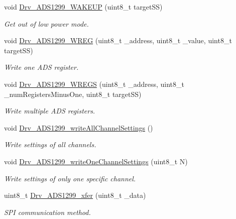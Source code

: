\begin{DoxyCompactItemize}
void \hyperlink{group__ADS1299__Library_ga641da43b050b7dfd11d3f8234d129158}{Drv\+\_\+\+A\+D\+S1299\+\_\+\+W\+A\+K\+E\+UP} (uint8\+\_\+t target\+SS)
\begin{DoxyCompactList}\small\item\em Get out of low power mode. \end{DoxyCompactList}\item 
void \hyperlink{group__ADS1299__Library_gaeb3dbf8ae39e90411b32757240f61b8b}{Drv\+\_\+\+A\+D\+S1299\+\_\+\+W\+R\+EG} (uint8\+\_\+t \+\_\+address, uint8\+\_\+t \+\_\+value, uint8\+\_\+t target\+SS)
\begin{DoxyCompactList}\small\item\em Write one A\+DS register. \end{DoxyCompactList}\item 
void \hyperlink{group__ADS1299__Library_gac0ee4d97d673cfedde936fb9d81e8c5d}{Drv\+\_\+\+A\+D\+S1299\+\_\+\+W\+R\+E\+GS} (uint8\+\_\+t \+\_\+address, uint8\+\_\+t \+\_\+num\+Registers\+Minus\+One, uint8\+\_\+t target\+SS)
\begin{DoxyCompactList}\small\item\em Write multiple A\+DS registers. \end{DoxyCompactList}\item 
void \hyperlink{group__ADS1299__Library_ga6191cb19901b35ad7f9e5d999064dac3}{Drv\+\_\+\+A\+D\+S1299\+\_\+write\+All\+Channel\+Settings} ()
\begin{DoxyCompactList}\small\item\em Write settings of all channels. \end{DoxyCompactList}\item 
void \hyperlink{group__ADS1299__Library_gab10b419566b34fa502514a113505312d}{Drv\+\_\+\+A\+D\+S1299\+\_\+write\+One\+Channel\+Settings} (uint8\+\_\+t N)
\begin{DoxyCompactList}\small\item\em Write settings of only one specific channel. \end{DoxyCompactList}\item 
uint8\+\_\+t \hyperlink{group__ADS1299__Library_gaacd804d5af6ab72174a9cb050dcf9041}{Drv\+\_\+\+A\+D\+S1299\+\_\+xfer} (uint8\+\_\+t \+\_\+data)
\begin{DoxyCompactList}\small\item\em S\+PI communication method. \end{DoxyCompactList}\end{DoxyCompactItemize}
